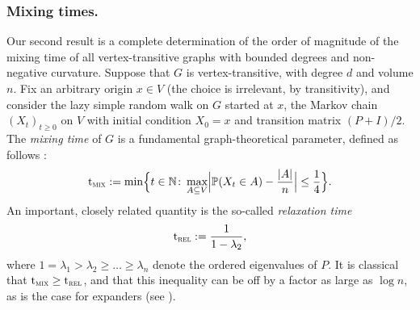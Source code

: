 \documentclass[10pt]{amsart}
\theoremstyle{definition}
\newcommand{\dN}{\mathbb {N}}
\newcommand{\PP}{{\mathbb{P}}}
\newcommand{\trel}{\mathrm{t}_{\textup{\textsc{rel}}}}
\newcommand{\tmix}{\mathrm{t}_{\textup{\textsc{mix}}}}
\begin{document}
\subsubsection*{Mixing times.} Our second result is a complete determination of the order of magnitude of the mixing time of all vertex-transitive graphs with bounded degrees and non-negative curvature. Suppose that $G$ is vertex-transitive, with degree $d$ and volume $n$. Fix an arbitrary origin $x\in V$ (the choice is irrelevant, by transitivity), and consider the lazy simple random walk on $G$ started at $x$, \ie the Markov chain $(X_t)_{t\ge 0}$ on $V$ with initial condition $X_0=x$ and transition matrix $(P+I)/2$. The \emph{mixing time} of $G$ is a fundamental graph-theoretical parameter, defined as follows \cite{MR3726904}:
\begin{equation*}
\tmix := \min\Bigl\{t\in\dN\colon \max_{A\subseteq V}\Bigl|\PP(X_t\in A)-\frac{|A|}{n}\Bigr|\le \frac 14\Bigr\}.
\end{equation*}
An important, closely related quantity is the so-called \emph{relaxation time}
\begin{equation*}
\trel := \frac{1}{1-\lambda_{2}},
\end{equation*}
where $1=\lambda_1>\lambda_2\ge\ldots\ge\lambda_n$ denote the ordered eigenvalues of $P$. It is classical that $\tmix \ge \trel$, and that this inequality can be off by a factor as large as $\log n$, as is the case for expanders (see \cite{MR3726904}).
\end{document}
